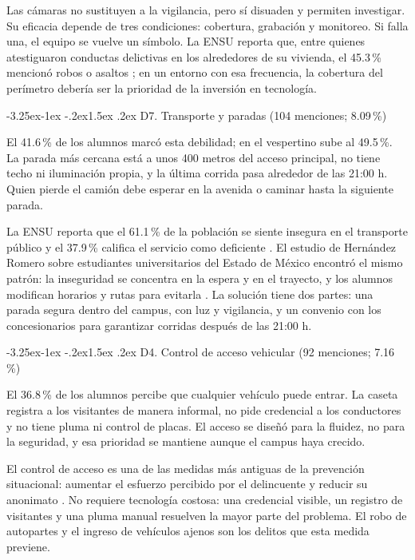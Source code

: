 \documentclass[11pt,a4paper]{article}
\makeatletter
\renewcommand\subsection{\@startsection{subsection}{2}{\z@}%
  {-3.25ex\@plus -1ex \@minus -.2ex}{1.5ex \@plus .2ex}%
  {\normalfont\large\bfseries\color{uazblue!85!black}}}
\makeatother
\begin{document}
Las cámaras no sustituyen a la vigilancia, pero sí disuaden y permiten
investigar. Su eficacia depende de tres condiciones: cobertura, grabación y
monitoreo. Si falla una, el equipo se vuelve un símbolo. La ENSU reporta que, entre quienes
atestiguaron conductas delictivas en los alrededores de su vivienda, el
45.3\,\% mencionó robos o asaltos \cite{inegi2026ensu}; en un entorno con esa
frecuencia, la cobertura del perímetro debería ser la prioridad de la inversión
en tecnología.

\subsection{D7. Transporte y paradas (104 menciones; 8.09\,\%)}

El 41.6\,\% de los alumnos marcó esta debilidad; en el vespertino sube al
49.5\,\%. La parada más cercana está a unos 400 metros del acceso principal, no
tiene techo ni iluminación propia, y la última corrida pasa alrededor de las
21:00 h. Quien pierde el camión debe esperar en la avenida o caminar hasta la
siguiente parada.

La ENSU reporta que el 61.1\,\% de la población se siente insegura en el
transporte público y el 37.9\,\% califica el servicio como deficiente
\cite{inegi2026ensu}. El estudio de Hernández Romero sobre estudiantes
universitarios del Estado de México encontró el mismo patrón: la inseguridad se
concentra en la espera y en el trayecto, y los alumnos modifican horarios y
rutas para evitarla \cite{hernandez2021}. La solución tiene dos partes: una
parada segura dentro del campus, con luz y vigilancia, y un convenio con los
concesionarios para garantizar corridas después de las 21:00 h.

\subsection{D4. Control de acceso vehicular (92 menciones; 7.16\,\%)}

El 36.8\,\% de los alumnos percibe que cualquier vehículo puede entrar. La
caseta registra a los visitantes de manera informal, no pide credencial a los
conductores y no tiene pluma ni control de placas. El acceso se diseñó para la
fluidez, no para la seguridad, y esa prioridad se mantiene aunque el campus haya
crecido.

El control de acceso es una de las medidas más antiguas de la prevención
situacional: aumentar el esfuerzo percibido por el delincuente y reducir su
anonimato \cite{unodc2010}. No requiere tecnología costosa: una credencial
visible, un registro de visitantes y una pluma manual resuelven la mayor parte
del problema. El robo de autopartes y el ingreso de vehículos ajenos son los
delitos que esta medida previene.
\end{document}
